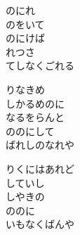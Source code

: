 \documentclass[10pt,b5j]{tarticle} %
\begin{document}
\vspace{1.5em} %
\newcommand{\linespace}{0.5em} %
\newcommand{\blocksize}{0.5\hsize} %
\begin{enumerate} %
    \begin{minipage}[c]{\blocksize}
    
        \vspace{\linespace}
        \item
        のにれ\\
        のをいて\\
        のにけば\\
        れつさ\\
        てしなくごれる
        
        \vspace{\linespace}
        \item
        りなきめ\\
        しかるめのに\\
        なるをらんと\\
        ののにして\\
        ばれしのなれや
        
        \vspace{\linespace}
        \item
        りくにはあれど\\
        していし\\
        しやきの\\
        ののに\\
        いもなくばんや
    
    \end{minipage}
\end{enumerate} %
\end{document}
